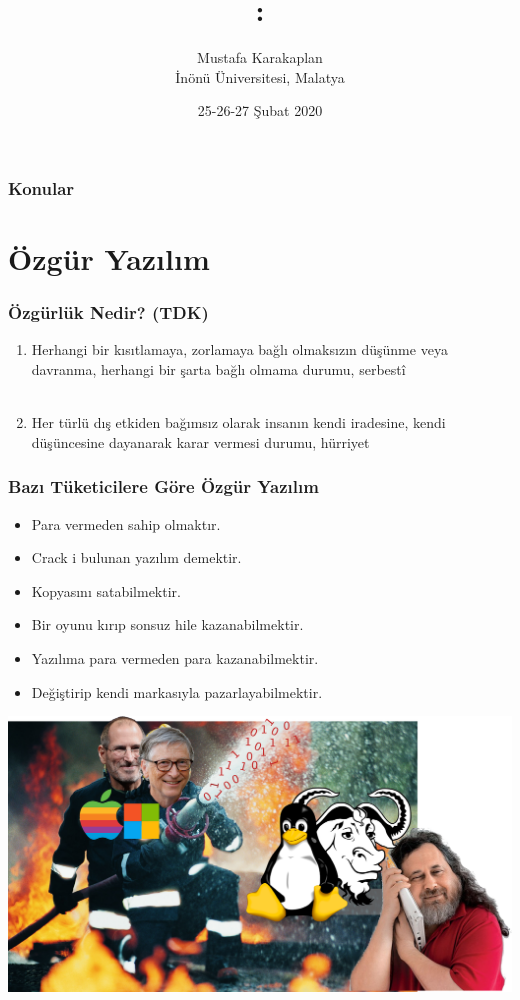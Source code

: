 \documentclass[english,svgnames,notes=hide,12pt]{beamer}
\title{\large\seminarname:\\\large\presentationtitle}
\author{Mustafa Karakaplan\\
    \small İnönü Üniversitesi, Malatya
}
\date{25-26-27 Şubat 2020}
\begin{document}
\thispagestyle{empty}
\begin{frame}
    \titlepage
\end{frame}

\begin{frame}
    \frametitle{Konular}
    \tableofcontents
\end{frame}


\section{Özgür Yazılım}

\begin{frame}
\frametitle{Özgürlük Nedir? (TDK)}

\begin{enumerate}[<+->]
\item  Herhangi bir kısıtlamaya, zorlamaya bağlı olmaksızın düşünme veya davranma, herhangi bir şarta bağlı olmama durumu, serbestî\\
~\\
\item Her türlü dış etkiden bağımsız olarak insanın kendi iradesine, kendi düşüncesine dayanarak karar vermesi durumu, hürriyet
\end{enumerate}

\end{frame}

\begin{frame}
\frametitle{Bazı Tüketicilere Göre Özgür Yazılım}
\begin{itemize}[<+->]
    \item Para vermeden sahip olmaktır.
    \item Crack i bulunan yazılım demektir.
    \item Kopyasını satabilmektir.
    \item Bir oyunu kırıp sonsuz hile kazanabilmektir. 
    \item Yazılıma para vermeden para kazanabilmektir.
    \item Değiştirip kendi markasıyla pazarlayabilmektir. 
\end{itemize}
\end{frame}

\begin{frame}
\includegraphics[width=1.0\textwidth]{imgs/software_wars}

\end{frame}
\end{document}
